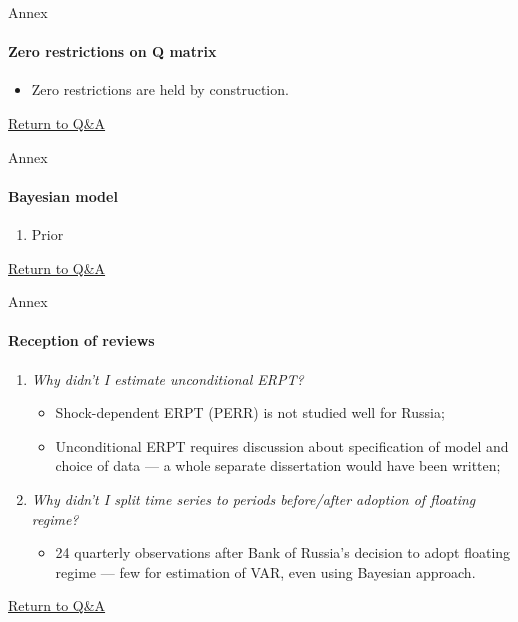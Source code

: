 \documentclass{beamer}
\begin{document}
\begin{frame}[noframenumbering]{Annex}
	\framesubtitle{Zero restrictions on Q matrix}
	\label{zero_q}
	\begin{algorithm}[H]
	\end{algorithm}
	\begin{itemize}
		\item Zero restrictions are held by construction.
	\end{itemize}
	\hyperref[qa]{Return to Q\&A}
\end{frame}

\begin{frame}[noframenumbering]{Annex}
	\framesubtitle{Bayesian model}
	\label{bvar}
	\begin{enumerate}
		\item Prior
	\end{enumerate}
	\hyperref[qa]{Return to Q\&A}
\end{frame}

\begin{frame}[noframenumbering]{Annex}
	\framesubtitle{Reception of reviews}
	\label{reception}
	\begin{enumerate}
		\item \textit{Why didn't I estimate unconditional ERPT?}
		\begin{itemize}
			\item Shock-dependent ERPT (PERR) is not studied well for Russia;
			\item Unconditional ERPT requires discussion about specification of model and choice of data --- a whole separate dissertation would have been written;
		\end{itemize}
		\item \textit{Why didn't I split time series to periods before/after adoption of floating regime?}
		\begin{itemize}
			\item 24 quarterly observations after Bank of Russia's decision to adopt floating regime --- few for estimation of VAR, even using Bayesian approach.
		\end{itemize}
	\end{enumerate}
\hyperref[qa]{Return to Q\&A}
\end{frame}
\end{document}
